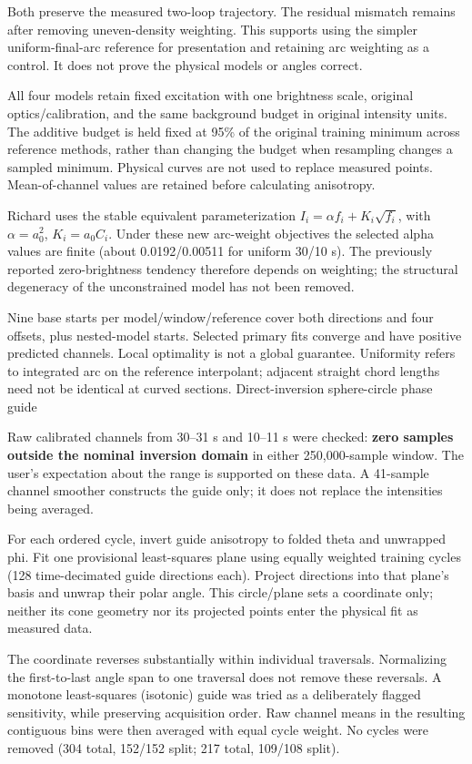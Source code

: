 \documentclass[10pt,a4paper]{article}
\begin{document}
Both preserve the measured two-loop trajectory. The residual mismatch remains after removing uneven-density weighting. This supports using the simpler uniform-final-arc reference for presentation and retaining arc weighting as a control. It does not prove the physical models or angles correct.

All four models retain fixed excitation with one brightness scale, original optics/calibration, and the same background budget in original intensity units. The additive budget is held fixed at 95\% of the original training minimum across reference methods, rather than changing the budget when resampling changes a sampled minimum. Physical curves are not used to replace measured points. Mean-of-channel values are retained before calculating anisotropy.

Richard uses the stable equivalent parameterization \(I_i=\alpha f_i+K_i\sqrt{f_i}\), with \(\alpha=a_0^2\), \(K_i=a_0C_i\). Under these new arc-weight objectives the selected alpha values are finite (about 0.0192/0.00511 for uniform 30/10 s). The previously reported zero-brightness tendency therefore depends on weighting; the structural degeneracy of the unconstrained model has not been removed.

Nine base starts per model/window/reference cover both directions and four offsets, plus nested-model starts. Selected primary fits converge and have positive predicted channels. Local optimality is not a global guarantee. Uniformity refers to integrated arc on the reference interpolant; adjacent straight chord lengths need not be identical at curved sections.
\newpage
{\Large Direct-inversion sphere-circle phase guide}

Raw calibrated channels from 30--31 s and 10--11 s were checked: \textbf{zero samples outside the nominal inversion domain} in either 250,000-sample window. The user's expectation about the range is supported on these data. A 41-sample channel smoother constructs the guide only; it does not replace the intensities being averaged.

For each ordered cycle, invert guide anisotropy to folded theta and unwrapped phi. Fit one provisional least-squares plane using equally weighted training cycles (128 time-decimated guide directions each). Project directions into that plane's basis and unwrap their polar angle. This circle/plane sets a coordinate only; neither its cone geometry nor its projected points enter the physical fit as measured data.

The coordinate reverses substantially within individual traversals. Normalizing the first-to-last angle span to one traversal does not remove these reversals. A monotone least-squares (isotonic) guide was tried as a deliberately flagged sensitivity, while preserving acquisition order. Raw channel means in the resulting contiguous bins were then averaged with equal cycle weight. No cycles were removed (304 total, 152/152 split; 217 total, 109/108 split).
\end{document}
